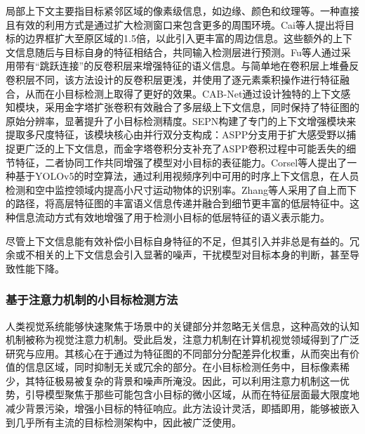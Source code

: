 局部上下文主要指目标紧邻区域的像素级信息，如边缘、颜色和纹理等。一种直接且有效的利用方式是通过扩大检测窗口来包含更多的周围环境。Cai等人\cite{Cai2016MultiScale}提出将目标的边界框扩大至原区域的1.5倍，以此引入更丰富的周边信息。这些额外的上下文信息随后与目标自身的特征相结合，共同输入检测层进行预测。Fu等人\cite{fu2017dssddeconv}通过采用带有“跳跃连接”的反卷积层来增强特征的语义信息。与简单地在卷积层上堆叠反卷积层不同，该方法设计的反卷积层更浅，并使用了逐元素乘积操作进行特征融合，从而在小目标检测上取得了更好的效果。CAB-Net\cite{Cui2022ContextAwareBN}通过设计独特的上下文感知模块，采用金字塔扩张卷积有效融合了多层级上下文信息，同时保持了特征图的原始分辨率，显著提升了小目标检测精度。SEPN\cite{Sun2022SEPNet}构建了专门的上下文增强模块来提取多尺度特征，该模块核心由并行双分支构成：ASPP分支用于扩大感受野以捕捉更广泛的上下文信息，而金字塔卷积分支补充了ASPP卷积过程中可能丢失的细节特征，二者协同工作共同增强了模型对小目标的表征能力。Corsel\cite{Corsel2023TemporalContext}等人提出了一种基于YOLOv5的时空算法，通过利用视频序列中可用的时序上下文信息，在人员检测和空中监控领域内提高小尺寸运动物体的识别率。Zhang等人\cite{Zhang2018RefineDet}采用了自上而下的路径，将高层特征图的丰富语义信息传递并融合到细节更丰富的低层特征中。这种信息流动方式有效地增强了用于检测小目标的低层特征的语义表示能力。

尽管上下文信息能有效补偿小目标自身特征的不足，但其引入并非总是有益的。冗余或不相关的上下文信息会引入显著的噪声，干扰模型对目标本身的判断，甚至导致性能下降。



\subsubsection{基于注意力机制的小目标检测方法}
人类视觉系统能够快速聚焦于场景中的关键部分并忽略无关信息，这种高效的认知机制被称为视觉注意力机制。受此启发，注意力机制在计算机视觉领域得到了广泛研究与应用。其核心在于通过为特征图的不同部分分配差异化权重，从而突出有价值的信息区域，同时抑制无关或冗余的部分。在小目标检测任务中，目标像素稀少，其特征极易被复杂的背景和噪声所淹没。因此，可以利用注意力机制这一优势，引导模型聚焦于那些可能包含小目标的微小区域，从而在特征层面最大限度地减少背景污染，增强小目标的特征响应。此方法设计灵活，即插即用，能够被嵌入到几乎所有主流的目标检测架构中，因此被广泛使用。

